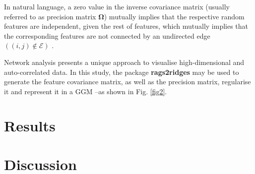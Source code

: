 \documentclass{amsart}
\theoremstyle{plain}
\begin{document}
In natural language, a zero value in the inverse covariance matrix (usually referred to as precision matrix $\mathbf{\Omega}$) mutually implies that the respective random features are independent, given the rest of features, which mutually implies that the corresponding features are not connected by an undirected edge $((i, j) \notin \mathcal{E})$ \cite{Peeters2022Rags2ridges:Matrices}.

Network analysis presents a unique approach to visualise high-dimensional and auto-correlated data. In this study, the package \textbf{rags2ridges} \cite{Peeters2022Rags2ridges:Matrices} may be used to generate the feature covariance matrix, as well as the precision matrix, regularise it and represent it in a GGM --as shown in Fig. \ref{fig2}.

\section{Results}

\section{Discussion}






\newpage
\printbibliography
\end{document}
